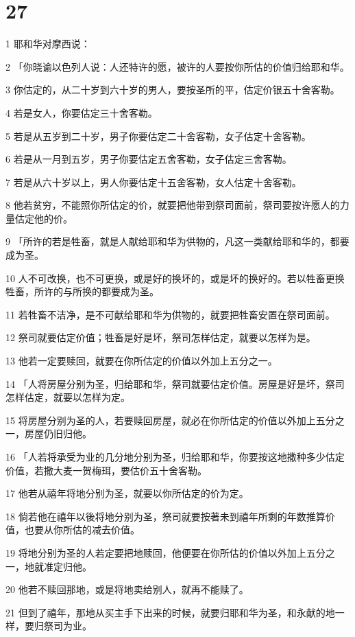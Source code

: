 \chapter{27}

\par 1 耶和华对摩西说：
\par 2 「你晓谕以色列人说：人还特许的愿，被许的人要按你所估的价值归给耶和华。
\par 3 你估定的，从二十岁到六十岁的男人，要按圣所的平，估定价银五十舍客勒。
\par 4 若是女人，你要估定三十舍客勒。
\par 5 若是从五岁到二十岁，男子你要估定二十舍客勒，女子估定十舍客勒。
\par 6 若是从一月到五岁，男子你要估定五舍客勒，女子估定三舍客勒。
\par 7 若是从六十岁以上，男人你要估定十五舍客勒，女人估定十舍客勒。
\par 8 他若贫穷，不能照你所估定的价，就要把他带到祭司面前，祭司要按许愿人的力量估定他的价。
\par 9 「所许的若是牲畜，就是人献给耶和华为供物的，凡这一类献给耶和华的，都要成为圣。
\par 10 人不可改换，也不可更换，或是好的换坏的，或是坏的换好的。若以牲畜更换牲畜，所许的与所换的都要成为圣。
\par 11 若牲畜不洁净，是不可献给耶和华为供物的，就要把牲畜安置在祭司面前。
\par 12 祭司就要估定价值；牲畜是好是坏，祭司怎样估定，就要以怎样为是。
\par 13 他若一定要赎回，就要在你所估定的价值以外加上五分之一。
\par 14 「人将房屋分别为圣，归给耶和华，祭司就要估定价值。房屋是好是坏，祭司怎样估定，就要以怎样为定。
\par 15 将房屋分别为圣的人，若要赎回房屋，就必在你所估定的价值以外加上五分之一，房屋仍旧归他。
\par 16 「人若将承受为业的几分地分别为圣，归给耶和华，你要按这地撒种多少估定价值，若撒大麦一贺梅珥，要估价五十舍客勒。
\par 17 他若从禧年将地分别为圣，就要以你所估定的价为定。
\par 18 倘若他在禧年以後将地分别为圣，祭司就要按著未到禧年所剩的年数推算价值，也要从你所估的减去价值。
\par 19 将地分别为圣的人若定要把地赎回，他便要在你所估的价值以外加上五分之一，地就准定归他。
\par 20 他若不赎回那地，或是将地卖给别人，就再不能赎了。
\par 21 但到了禧年，那地从买主手下出来的时候，就要归耶和华为圣，和永献的地一样，要归祭司为业。
